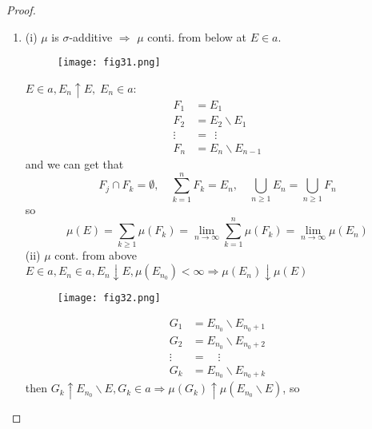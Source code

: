 \begin{proof}
	\text{}
	\begin{enumerate}
		\item \text{}
		
		(i) $ \mu  $ is $ \sigma $-additive $ \Rightarrow $ $ \mu $ conti. from below at $  E \in a. $
		\begin{figure}[!htb]
			\centering
			\texttt{[image: fig31.png]}
			\label{fig31}
		\end{figure}
	    $ E \in a, {E_n} \uparrow E,\;{E_n} \in a$:
	    \begin{equation}
	    \begin{split}
	    {F_1} & = {E_1} \\
	    {F_2} & = {E_2}\backslash {E_1}\\
	     \vdots \ \  & = \ \  \vdots  \\
	    {F_n} & = {E_n}\backslash {E_{n - 1}}
	    \end{split}
	    \label{eq3.4}
	    \end{equation}
	    and we can get that
	    \begin{equation}
	    {F_j} \cap {F_k} = \emptyset ,\quad \sum\limits_{k = 1}^n {{F_k}}  = {E_n}, \quad \bigcup\limits_{n \geqslant 1} {{E_n}}  = \bigcup\limits_{n \geqslant 1} {{F_n}} 
	    \label{eq3.5}
	    \end{equation}
	    so 
	    \begin{equation}
	    \mu \left( E \right) = \sum\limits_{k \geqslant 1} {\mu \left( {{F_k}} \right)}  = \mathop {\lim }\limits_{n \to \infty } \sum\limits_{k = 1}^n {\mu \left( {{F_k}} \right)}  = \mathop {\lim }\limits_{n \to \infty } \mu \left( {{E_n}} \right)
	    \label{eq3.6}
	    \end{equation}
		(ii) $ \mu $ cont. from above $ E \in a, {E_n} \in a,{E_n} \downarrow E,\mu \left( {{E_{{n_0}}}} \right) < \infty  \Rightarrow \mu \left( {{E_n}} \right) \downarrow \mu \left( E \right)$
		\begin{figure}[!htb]
			\centering
			\texttt{[image: fig32.png]}
			\label{fig32}
		\end{figure}
		\begin{equation}
		\begin{split}
		{G_1} & = {E_{{n_0}}}\backslash {E_{{n_0} + 1}}\\
		{G_2} & = {E_{{n_0}}}\backslash {E_{{n_0} + 2}} \\
		\vdots \quad & = \quad \vdots\\
		{G_k} & = {E_{{n_0}}}\backslash {E_{{n_0} + k}}
		\end{split}
		\label{eq3.7}
		\end{equation}
		then ${G_k} \uparrow {E_{{n_0}}}\backslash {E}, {G_k} \in a \Rightarrow \mu \left( {{G_k}} \right) \uparrow \mu \left( {{E_{{n_0}}}\backslash E} \right)$, so
		

\end{enumerate}
\end{proof}
